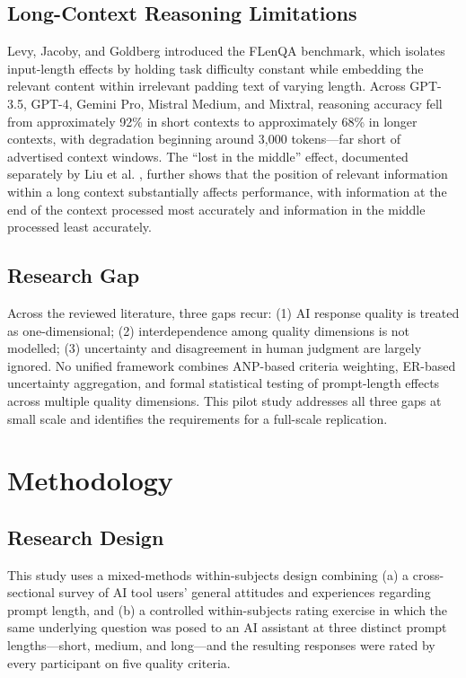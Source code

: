 \documentclass[conference]{IEEEtran}
\begin{document}
\subsection{Long-Context Reasoning Limitations}
Levy, Jacoby, and Goldberg \cite{levy2024} introduced the FLenQA benchmark, which isolates input-length effects by holding task difficulty constant while embedding the relevant content within irrelevant padding text of varying length. Across GPT-3.5, GPT-4, Gemini Pro, Mistral Medium, and Mixtral, reasoning accuracy fell from approximately 92\% in short contexts to approximately 68\% in longer contexts, with degradation beginning around 3{,}000 tokens---far short of advertised context windows. The ``lost in the middle'' effect, documented separately by Liu et al. \cite{liu2024lostmiddle}, further shows that the position of relevant information within a long context substantially affects performance, with information at the end of the context processed most accurately and information in the middle processed least accurately.

\subsection{Research Gap}
Across the reviewed literature, three gaps recur: (1) AI response quality is treated as one-dimensional; (2) interdependence among quality dimensions is not modelled; (3) uncertainty and disagreement in human judgment are largely ignored. No unified framework combines ANP-based criteria weighting, ER-based uncertainty aggregation, and formal statistical testing of prompt-length effects across multiple quality dimensions. This pilot study addresses all three gaps at small scale and identifies the requirements for a full-scale replication.

\section{Methodology}

\subsection{Research Design}
This study uses a mixed-methods within-subjects design combining (a) a cross-sectional survey of AI tool users' general attitudes and experiences regarding prompt length, and (b) a controlled within-subjects rating exercise in which the same underlying question was posed to an AI assistant at three distinct prompt lengths---short, medium, and long---and the resulting responses were rated by every participant on five quality criteria.
\end{document}
